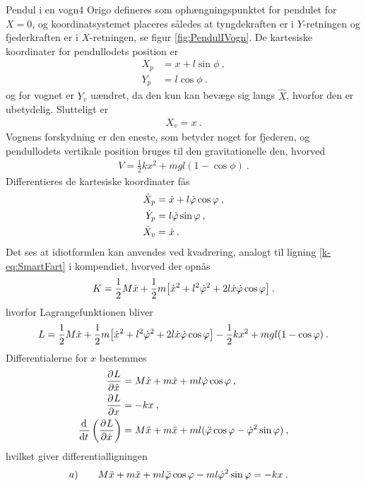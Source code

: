 \begin{opgave}{Pendul i en vogn}{4}
\opg Origo defineres som ophængningspunktet for pendulet for $X=0$, og koordinatsystemet placeres således at tyngdekraften er i $Y$-retningen og fjederkraften er i $X$-retningen, se figur \ref{fig:PendulIVogn}.
\opg De kartesiske koordinater for pendullodets position er
\begin{align*}
	X_p &= x + l\sin\phi \: , \\
	Y_p &= l\cos\phi \: .
\end{align*}
og for vognet er $Y_v$ uændret, da den kun kan bevæge sig langs $\hat{X}$, hvorfor den er ubetydelig. Slutteligt er
\begin{align*}
	X_v = x \: .
\end{align*}
\opg Vognens forskydning er den eneste, som betyder noget for fjederen, og pendullodets vertikale position bruges til den gravitationelle den, hvorved
\begin{align*}
	V = \frac{1}{2}kx^2 + mgl(1-\cos\phi) \: .
\end{align*}
\opg Differentieres de kartesiske koordinater fås
\begin{align*}
	\dt{X}_p &= \dt{x} + l\dt{\phi}\cos\phi \: , \\
	\dt{Y}_p &= l\dt{\phi}\sin\phi \: , \\
	\dt{X}_v &= \dt{x} \: .
\end{align*}
Det ses at idiotformlen kan anvendes ved kvadrering, analogt til ligning \eqref{k-eq:SmartFart} i kompendiet, hvorved der opnås
\begin{align*}
	K = \frac{1}{2}M\dt{x} + \frac{1}{2}m\big[\dt{x}^2 + l^2\dt{\phi}^2 + 2l\dt{x}\dt{\phi}\cos\phi\big] \: .
\end{align*}
hvorfor Lagrangefunktionen bliver
\begin{align*}
	L = \frac{1}{2}M\dt{x} + \frac{1}{2}m\big[\dt{x}^2 + l^2\dt{\phi}^2 + 2l\dt{x}\dt{\phi}\cos\phi\big] - \frac{1}{2}kx^2 + mgl(1-\cos\phi) \: .
\end{align*}
\opg Differentialerne  for $x$ bestemmes
\begin{align*}
	\pdif{\dt{x}}{L} &= M\dt{x}+ m\dt{x} + ml\dt{\phi}\cos\phi \: , \\
	\pdif{x}{L} &= -kx \: ,\\
	\el{\dt{x}} &= M\ddt{x}+ m\ddt{x} + ml(\ddt{\phi}\cos\phi - \dt{\phi}^2\sin\phi) \: ,
\end{align*}
hvilket giver differentialligningen
\begin{align*}
	a) \qquad M\ddt{x} + m\ddt{x} + ml\ddt{\phi}\cos\phi - ml\dt{\phi}^2\sin\phi &= -kx \: .

\end{align*}
\end{opgave}
